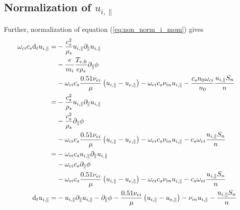 \subsection{Normalization of \texorpdfstring{$u_{i,\|}$}{parallel ion momentum}}
Further, normalization of equation (\ref{eq:non_norm_i_mom}) gives
%
\begin{align*}
 \om_{ci} c_s
 \d_t u_{i,\|}
 =&
 - \frac{c_s^2}{\rho_s}
 u_{i,\|} \partial_\| u_{i,\|}
 \\
 &
 - \frac{e}{m_i} \frac{T_{e,0}}{e\rho_s}
 \partial_\|\phi
 \\
 &
 - \omega_{ci} c_s
 \frac{ 0.51 \nu_{ei} }{ \mu } \L(u_{i,\|}-u_{e,\|}\R)
 - \om_{ci} c_s
 \nu_{in} u_{i,\|}
 - \frac{c_s n_0 \om_{ci}}{n_0}
 \frac{u_{i,\|}S_{n}}{n}
 \\
%
%
 =&
 - \frac{c_s^2}{\rho_s}
 u_{i,\|} \partial_\| u_{i,\|}
 \\
 &
 - \frac{c_s^2}{\rho_s}
 \partial_\|\phi
 \\
 &
 - \omega_{ci} c_s
 \frac{ 0.51 \nu_{ei} }{ \mu } \L(u_{i,\|}-u_{e,\|}\R)
 - \om_{ci} c_s
 \nu_{in} u_{i,\|}
 - c_s \om_{ci}
 \frac{u_{i,\|}S_{n}}{n}
 \\
%
%
 =&
 - \omega_{ci} c_s
 u_{i,\|} \partial_\| u_{i,\|}
 \\
 &
 - \omega_{ci} c_s
 \partial_\|\phi
 \\
 &
 - \omega_{ci} c_s
 \frac{ 0.51 \nu_{ei} }{ \mu } \L(u_{i,\|}-u_{e,\|}\R)
 - \om_{ci} c_s
 \nu_{in} u_{i,\|}
 - c_s \om_{ci}
 \frac{u_{i,\|}S_{n}}{n}
 \\
%
%
 \d_t u_{i,\|}
 =&
 - u_{i,\|} \partial_\| u_{i,\|}
 - \partial_\|\phi
 - \frac{ 0.51 \nu_{ei} }{ \mu } \L(u_{i,\|}-u_{e,\|}\R)
 - \nu_{in} u_{i,\|}
 - \frac{u_{i,\|}S_{n}}{n}
\end{align*}
%
